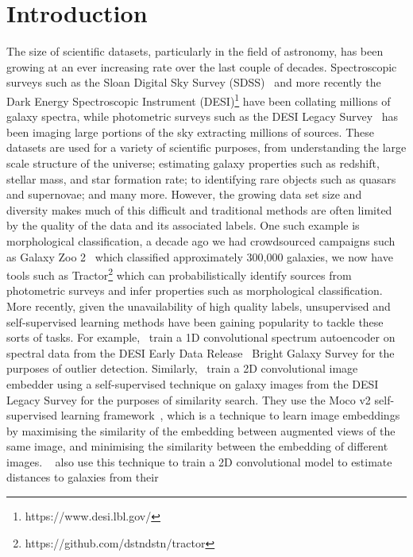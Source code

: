 
\section{Introduction}\label{sec:introduction}
The size of scientific datasets, particularly in the field of astronomy, has been growing at an ever increasing rate
over the last couple of decades.
Spectroscopic surveys such as the Sloan Digital Sky Survey (SDSS)~\citep{york2000} and more recently the Dark Energy
Spectroscopic Instrument (DESI)\footnote{https://www.desi.lbl.gov/} have been collating millions of galaxy spectra, while photometric
surveys such as the DESI Legacy Survey~\citep{desilegacy2018} has been imaging large portions of the sky extracting millions
of sources.
These datasets are used for a variety of scientific purposes, from understanding the large scale structure of the universe;
estimating galaxy properties such as redshift, stellar mass, and star formation rate; to identifying rare objects such as
quasars and supernovae; and many more.
However, the growing data set size and diversity makes much of this difficult and traditional methods are often
limited by the quality of the data and its associated labels.
One such example is morphological classification, a decade ago we had crowdsourced campaigns such as Galaxy Zoo 2~\citep{willet2013}
which classified approximately 300,000 galaxies, we now have tools such as Tractor\footnote{https://github.com/dstndstn/tractor}
which can probabilistically identify sources from photometric surveys and infer properties such as morphological classification.
More recently, given the unavailability of high quality labels, unsupervised and self-supervised learning methods have been
gaining popularity to tackle these sorts of tasks.
For example,~\cite{liang2023} train a 1D convolutional spectrum autoencoder on spectral data from the DESI Early Data
Release~\citep{desiearly2023} Bright Galaxy Survey for the purposes of outlier detection.
Similarly,~\cite{stein2021} train a 2D convolutional image embedder using a self-supervised technique on galaxy images
from the DESI Legacy Survey for the purposes of similarity search.
They use the Moco v2 self-supervised learning framework~\citep{moco2020, mocov22020}, which is a technique to learn image embeddings
by maximising the similarity of the embedding between augmented views of the same image, and minimising the similarity between
the embedding of different images.
~\cite{hayat2021} also use this technique to train a 2D convolutional model to estimate distances to galaxies from their
